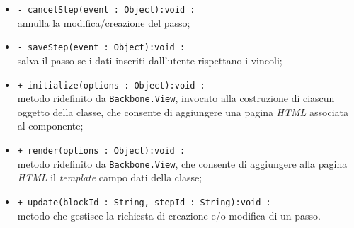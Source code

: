 \begin{flushleft}
\begin{itemize}
\begin{sloppypar}
\begin{itemize}
  \item \texttt{- cancelStep(event : Object):void :}\\ annulla la modifica/creazione del passo;
  \item \texttt{- saveStep(event : Object):void :}\\ salva il passo se i dati inseriti dall'utente rispettano i vincoli;
\item \texttt{+ initialize(options : Object):void :}\\ metodo ridefinito da \texttt{Backbone.View}, invocato alla costruzione di ciascun oggetto della classe, che consente di aggiungere una pagina \textit{HTML} associata al componente;
\item \texttt{+ render(options : Object):void :}\\ metodo ridefinito da \texttt{Backbone.View}, che consente di aggiungere alla pagina \textit{HTML} il \textit{template} campo dati della classe;
\item \texttt{+ update(blockId : String, stepId : String):void :}\\ metodo che gestisce la richiesta di creazione e/o modifica di un passo.
\end{itemize}
\end{sloppypar}
\end{itemize}
\end{flushleft}

